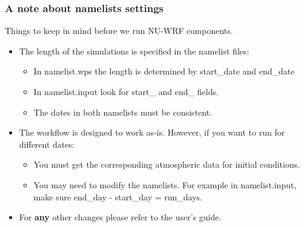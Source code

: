 \begin{frame}[fragile]\frametitle{A note about namelists settings}

Things to keep in mind before we run NU-WRF components.
\mbox{}\\
\begin{itemize}
\item The length of the simulations is specified in the namelist files:
\begin{itemize}
\item In namelist.wps the length is determined by start\_date and end\_date
\item In namelist.input look for start\_ and end\_ fields. 
\item The dates in both namelists must be consistent.
\end{itemize}
\item The workflow is designed to work as-is. However, if you want to run for different dates:
\begin{itemize}
\item You must get the corresponding atmospheric data for initial conditions. 
\item You may need to modify the namelists. For example in namelist.input, make sure end\_day - start\_day = run\_days.
\end{itemize}
\item For \textbf{any} other changes please refer to the user's guide.
\end{itemize}

\end{frame}

